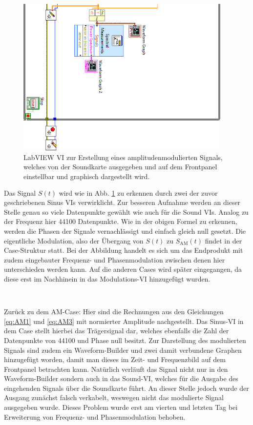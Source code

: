 \begin{figure}[H]
	\centering
	\includegraphics[width=0.95\textwidth]{pic/am2.png}
	\caption{LabVIEW VI zur Erstellung eines amplitudenmodulierten Signals, welches von der Soundkarte ausgegeben und auf dem Frontpanel einstellbar und graphisch dargestellt wird.}
	\label{fig:am}	
\end{figure} 

\thispagestyle{empty}
Das Signal $S(t)$ wird wie in Abb. \ref{fig:am} zu erkennen durch zwei der zuvor geschriebenen Sinus VIs verwirklicht.
Zur besseren Aufnahme werden an dieser Stelle genau so viele Datenpunkte gewählt wie auch für die Sound VIs. 
Analog zu der Frequenz hier 44100 Datenpunkte.
Wie in der obigen Formel zu erkennen, werden die Phasen der Signale vernachlässigt und einfach gleich null gesetzt.
Die eigentliche Modulation, also der Übergang von $S(t)$ zu $S_\text{AM}(t)$ findet in der Case-Struktur statt.
Bei der Abbildung handelt es sich um das Endprodukt mit zudem eingebauter Frequenz- und Phasenmodulation zwischen denen hier unterschieden werden kann.
Auf die anderen Cases wird später eingegangen, da diese erst im Nachhinein in das Modulations-VI hinzugefügt wurden.
	
\

Zurück zu dem AM-Case: Hier sind die Rechnungen aus den Gleichungen \ref{eq:AM1} und \ref{eq:AM3} mit normierter Amplitude nachgestellt.
Das Sinus-VI in dem Case stellt hierbei das Trägersignal dar, welches ebenfalls die Zahl der Datenpunkte von 44100 und Phase null besitzt.
Zur Darstellung des modulierten Signals sind zudem ein Waveform-Builder und zwei damit verbundene Graphen hinzugefügt worden, damit man dieses im Zeit- und Frequenzbild auf dem Frontpanel betrachten kann.
Natürlich verläuft das Signal nicht nur in den Waveform-Builder sondern auch in das Sound-VI, welches für die Ausgabe des eingehenden Signals über die Soundkarte führt.
An dieser Stelle jedoch wurde der Ausgang zunächst falsch verkabelt, weswegen nicht das modulierte Signal ausgegeben wurde.
Dieses Problem wurde erst am vierten und letzten Tag bei Erweiterung von Frequenz- und Phasenmodulation behoben.
	
